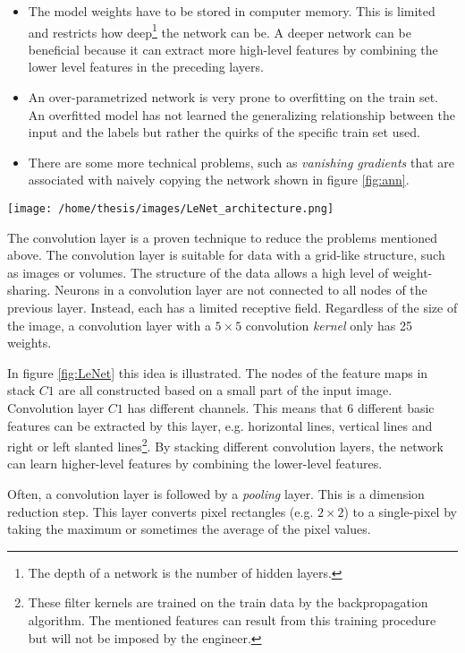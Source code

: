\begin{itemize}
    \item The model weights have to be stored in computer memory. 
    This is limited and restricts how deep\footnote{The depth of a network is the number of hidden layers.} the network can be.
    A deeper network can be beneficial because it can extract more high-level \Gls{features} by combining the lower level features in the preceding layers. 
    \item An over-parametrized network is very prone to overfitting on the train set. 
    An overfitted model has not learned the generalizing relationship between the input and the labels but rather the quirks of the specific train set used.
    \item There are some more technical problems, such as \textit{vanishing gradients} that are associated with naively copying the network shown in figure \ref{fig:ann}. 
\end{itemize}
\begin{SCfigure}[][h!]
    \centering
    \texttt{[image: /home/thesis/images/LeNet\_architecture.png]}
    \caption{
        Illustration of LeNet, a famous \Gls{cnn} architecture.
        Image is taken from the famous paper \texttt{Gradient-Based Learning Applied to Document Recognition} by Yann LeCun, Léon Battou, Yoshua Bengio and Patrick Haffner. \label{fig:LeNet}
        }
\end{SCfigure}
\par{
    The convolution layer is a proven technique to reduce the problems mentioned above.
    The convolution layer is suitable for data with a grid-like structure, such as images or volumes.
    The structure of the data allows a high level of weight-sharing. 
    Neurons in a convolution layer are not connected to all nodes of the previous layer. Instead, each has a limited receptive field.
    Regardless of the size of the image, a convolution layer with a $5\times 5$ convolution \textit{kernel} only has 25 weights.
}
\par{
    In figure \ref{fig:LeNet} this idea is illustrated. 
    The nodes of the feature maps in stack $C1$ are all constructed based on a small part of the input image.
    Convolution layer $C1$ has different channels. 
    This means that 6 different basic features can be extracted by this layer, e.g. horizontal lines, vertical lines and right or left slanted lines\footnote{
        These filter kernels are trained on the train data by the backpropagation algorithm. The mentioned features can result from this training procedure but will not be imposed by the engineer.
        }.
    By stacking different convolution layers, the network can learn higher-level features by combining the lower-level features.
}
\par{
    Often, a convolution layer is followed by a \textit{pooling} layer. 
    This is a dimension reduction step.
    This layer converts pixel rectangles (e.g. $2\times 2$) to a single-pixel by taking the maximum or sometimes the average of the pixel values.
}



